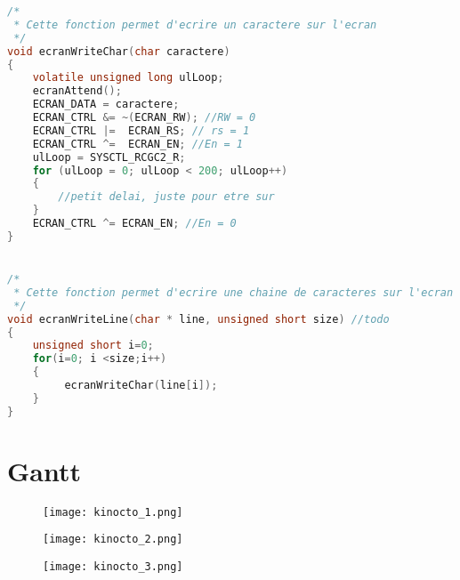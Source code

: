 \begin{lstlisting}[language=C]
/*
 * Cette fonction permet d'ecrire un caractere sur l'ecran
 */
void ecranWriteChar(char caractere)
{
    volatile unsigned long ulLoop;
    ecranAttend();
    ECRAN_DATA = caractere;
    ECRAN_CTRL &= ~(ECRAN_RW); //RW = 0
    ECRAN_CTRL |=  ECRAN_RS; // rs = 1
    ECRAN_CTRL ^=  ECRAN_EN; //En = 1
    ulLoop = SYSCTL_RCGC2_R;
    for (ulLoop = 0; ulLoop < 200; ulLoop++) 
    {
        //petit delai, juste pour etre sur
    }
    ECRAN_CTRL ^= ECRAN_EN; //En = 0
}


/*
 * Cette fonction permet d'ecrire une chaine de caracteres sur l'ecran
 */
void ecranWriteLine(char * line, unsigned short size) //todo
{
    unsigned short i=0;
    for(i=0; i <size;i++)
    {
         ecranWriteChar(line[i]);
    }
}

\end{lstlisting}

\section{Gantt}
\label{s:gantt}
\begin{figure}[htb]

\end{figure}

\begin{figure}
\centering
\addtolength{\evensidemargin}{-1in}	
\addtolength{\oddsidemargin}{-3in}
\textwidth 8in

\texttt{[image: kinocto\_1.png]}
\end{figure}
\begin{figure}
\centering
\addtolength{\evensidemargin}{-1in}	
\addtolength{\oddsidemargin}{-3in}
\textwidth 8in

\texttt{[image: kinocto\_2.png]}
\end{figure}
\begin{figure}
\centering
\addtolength{\evensidemargin}{-1in}	
\addtolength{\oddsidemargin}{-3in}
\textwidth 8in

\texttt{[image: kinocto\_3.png]}
\end{figure}

